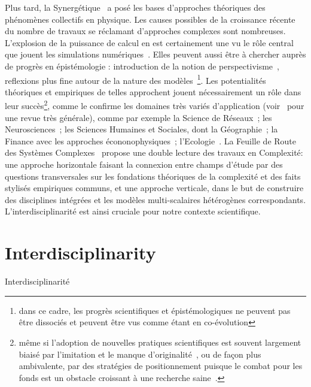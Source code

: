 {Plus tard, la Synergétique~\cite{haken1980synergetics} a posé les bases d'approches théoriques des phénomènes collectifs en physique. Les causes possibles de la croissance récente du nombre de travaux se réclamant d'approches complexes sont nombreuses. L'explosion de la puissance de calcul en est certainement une vu le rôle central que jouent les simulations numériques~\cite{varenne2010simulations}. Elles peuvent aussi être à chercher auprès de progrès en épistémologie : introduction de la notion de perspectivisme~\cite{giere2010scientific}, reflexions plus fine autour de la nature des modèles~\cite{varenne2013modeliser}\footnote{dans ce cadre, les progrès scientifiques et épistémologiques ne peuvent pas être dissociés et peuvent être vus comme étant en co-évolution}. Les potentialités théoriques et empiriques de telles approchent jouent nécessairement un rôle dans leur succès\footnote{même si l'adoption de nouvelles pratiques scientifiques est souvent largement biaisé par l'imitation et le manque d'originalité~\cite{dirk1999measure}, ou de façon plus ambivalente, par des stratégies de positionnement puisque le combat pour les fonds est un obstacle croissant à une recherche saine~\cite{bollen2014funding}.}, comme le confirme les domaines très variés d'application (voir~\cite{newman2011complex} pour une revue très générale), comme par exemple la Science de Réseaux~\cite{barabasi2002linked}; les Neurosciences~\cite{koch1999complexity}; les Sciences Humaines et Sociales,  dont la Géographie~\cite{manson2001simplifying}\cite{pumain1997pour}; la Finance avec les approches écononophysiques~\cite{stanley1999econophysics}; l'Ecologie~\cite{grimm2005pattern}. La Feuille de Route des Systèmes Complexes~\cite{2009arXiv0907.2221B} propose une double lecture des travaux en Complexité: une approche horizontale faisant la connexion entre champs d'étude par des questions transversales sur les fondations théoriques de la complexité et des faits stylisés empiriques communs, et une approche verticale, dans le but de construire des disciplines intégrées et les modèles multi-scalaires hétérogènes correspondants. L'interdisciplinarité est ainsi cruciale pour notre contexte scientifique.

}


\section*{Interdisciplinarity}{Interdisciplinarité}



